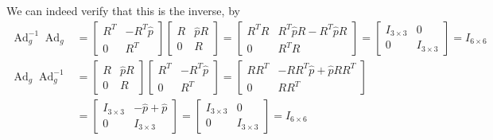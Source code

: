 We can indeed verify that this is the inverse, by
\begin{align*}
    \operatorname{Ad}_{g}^{-1}
    \operatorname{Ad}_{g}
     & =
    \begin{bmatrix}
        R^{T} & -R^{T} \widehat{p} \\
        0     & R^{T}
    \end{bmatrix}
    \begin{bmatrix}
        R & \widehat{p} R \\
        0 & R
    \end{bmatrix}
    =
    \begin{bmatrix}
        R^{T} R & R^{T} \widehat{p} R - R^{T} \widehat{p} R \\
        0       & R^{T} R
    \end{bmatrix}
    =
    \begin{bmatrix}
        I_{3 \times 3} & 0              \\
        0              & I_{3 \times 3}
    \end{bmatrix}
    =
    I_{6 \times 6}
    \\
    \operatorname{Ad}_{g}
    \operatorname{Ad}_{g}^{-1}
     & =
    \begin{bmatrix}
        R & \widehat{p} R \\
        0 & R
    \end{bmatrix}
    \begin{bmatrix}
        R^{T} & -R^{T} \widehat{p} \\
        0     & R^{T}
    \end{bmatrix}
    =
    \begin{bmatrix}
        R R^{T} & -R R^{T} \widehat{p} + \widehat{p} R R^T \\
        0       & R R^{T}
    \end{bmatrix}
    \\ & =
    \begin{bmatrix}
        I_{3 \times 3} & - \widehat{p} + \widehat{p} \\
        0              & I_{3 \times 3}
    \end{bmatrix}
    =
    \begin{bmatrix}
        I_{3 \times 3} & 0              \\
        0              & I_{3 \times 3}
    \end{bmatrix}
    =
    I_{6 \times 6}
\end{align*}
